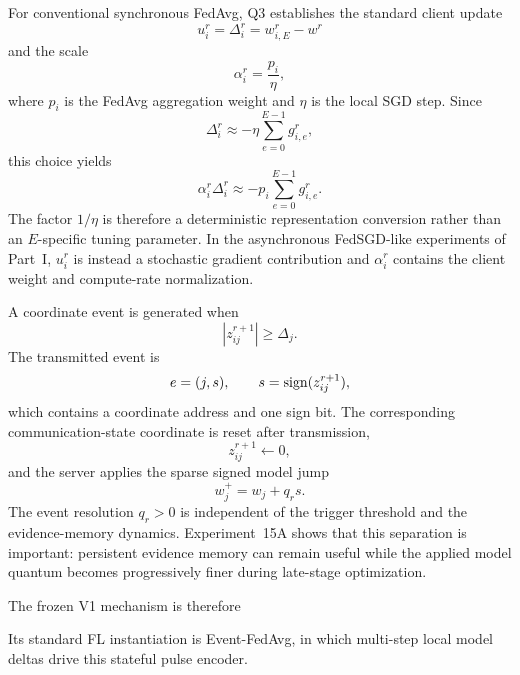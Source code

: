 For conventional synchronous FedAvg, Q3 establishes the standard client update
\begin{equation}
    u_i^r=\Delta_i^r=w_{i,E}^r-w^r
\end{equation}
and the scale
\begin{equation}
    \boxed{
    \alpha_i^r=\frac{p_i}{\eta},
    }
    \label{eq:consolidated-fedavg-scale}
\end{equation}
where $p_i$ is the FedAvg aggregation weight and $\eta$ is the local SGD step. Since
\begin{equation}
    \Delta_i^r\approx-\eta\sum_{e=0}^{E-1}g_{i,e}^r,
\end{equation}
this choice yields
\begin{equation}
    \alpha_i^r\Delta_i^r
    \approx
    -p_i\sum_{e=0}^{E-1}g_{i,e}^r.
\end{equation}
The factor $1/\eta$ is therefore a deterministic representation conversion rather than an $E$-specific tuning parameter. In the asynchronous FedSGD-like experiments of Part~I, $u_i^r$ is instead a stochastic gradient contribution and $\alpha_i^r$ contains the client weight and compute-rate normalization.

A coordinate event is generated when
\begin{equation}
    |z_{ij}^{r+1}|\geq\Delta_j.
\end{equation}
The transmitted event is
\begin{equation}
    e=(j,s),
    \qquad
    s=\operatorname{sign}(z_{ij}^{r+1}),
\end{equation}
which contains a coordinate address and one sign bit. The corresponding communication-state coordinate is reset after transmission,
\begin{equation}
    z_{ij}^{r+1}\leftarrow0,
\end{equation}
and the server applies the sparse signed model jump
\begin{equation}
    w_j^+=w_j+q_r s.
    \label{eq:consolidated-server-jump}
\end{equation}
The event resolution $q_r>0$ is independent of the trigger threshold and the evidence-memory dynamics. Experiment~15A shows that this separation is important: persistent evidence memory can remain useful while the applied model quantum becomes progressively finer during late-stage optimization.

The frozen V1 mechanism is therefore
\begin{center}
\end{center}
Its standard FL instantiation is Event-FedAvg, in which multi-step local model deltas drive this stateful pulse encoder.

